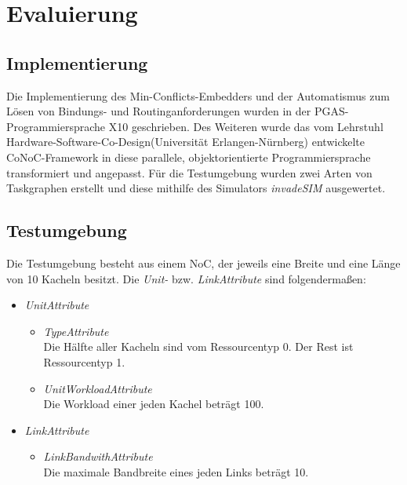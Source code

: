 \chapter{Evaluierung}\label{evaluierung}

\section{Implementierung} \label{Tests}
Die Implementierung des Min-Conflicts-Embedders und der Automatismus zum Lösen von Bindungs- und Routinganforderungen wurden in der PGAS-Programmiersprache X10 \cite{x10} \cite{pgas} geschrieben. Des Weiteren wurde das vom Lehrstuhl \grqq Hardware-Software-Co-Design\grqq  (Universität Erlangen-Nürnberg) entwickelte CoNoC-Framework in diese parallele, objektorientierte Programmiersprache transformiert und angepasst. Für die Testumgebung wurden zwei Arten von Taskgraphen erstellt und diese mithilfe des Simulators \textit{invadeSIM} \cite{invadeSIM}  ausgewertet.



\section{Testumgebung} \label{Testumgebung1} 
Die Testumgebung besteht aus einem NoC, der jeweils eine Breite und eine Länge von 10 Kacheln besitzt. Die \textit{Unit-} bzw. \textit{LinkAttribute} sind folgendermaßen:
\\
\begin{itemize}
\item \textit{UnitAttribute}
\begin{itemize}
\item \textit{TypeAttribute}\\
Die Hälfte aller Kacheln sind vom Ressourcentyp 0. Der Rest ist Ressourcentyp 1.
\item \textit{UnitWorkloadAttribute}\\
Die Workload einer jeden Kachel beträgt 100.

\end{itemize}
\item \textit{LinkAttribute}
\begin{itemize}
\item \textit{LinkBandwithAttribute}\\
Die maximale Bandbreite eines jeden Links beträgt 10.
\end{itemize}
\end{itemize}

